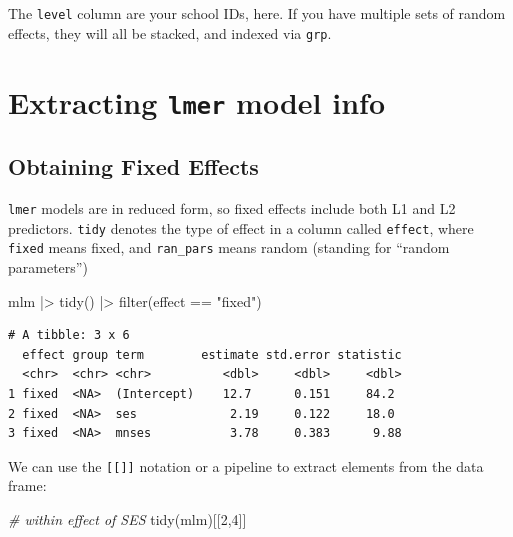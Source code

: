 \documentclass[
  letterpaper,
  DIV=11,
  numbers=noendperiod]{scrreprt}
\newenvironment{Shaded}{\begin{snugshade}}{\end{snugshade}}
\newcommand{\CommentTok}[1]{\textcolor[rgb]{0.38,0.63,0.69}{\textit{#1}}}
\newcommand{\DecValTok}[1]{\textcolor[rgb]{0.25,0.63,0.44}{#1}}
\newcommand{\FunctionTok}[1]{\textcolor[rgb]{0.02,0.16,0.49}{#1}}
\newcommand{\NormalTok}[1]{\textcolor[rgb]{0.00,0.44,0.13}{#1}}
\newcommand{\SpecialCharTok}[1]{\textcolor[rgb]{0.25,0.44,0.63}{#1}}
\newcommand{\StringTok}[1]{\textcolor[rgb]{0.25,0.44,0.63}{#1}}
\begin{document}
The \texttt{level} column are your school IDs, here. If you have
multiple sets of random effects, they will all be stacked, and indexed
via \texttt{grp}.

\hypertarget{extracting-lmer-model-info}{%
\section{\texorpdfstring{Extracting \texttt{lmer} model
info}{Extracting lmer model info}}\label{extracting-lmer-model-info}}

\hypertarget{obtaining-fixed-effects}{%
\subsection{Obtaining Fixed Effects}\label{obtaining-fixed-effects}}

\texttt{lmer} models are in reduced form, so fixed effects include both
L1 and L2 predictors. \texttt{tidy} denotes the type of effect in a
column called \texttt{effect}, where \texttt{fixed} means fixed, and
\texttt{ran\_pars} means random (standing for ``random parameters'')

\begin{Shaded}
\begin{Highlighting}[]
\NormalTok{mlm }\SpecialCharTok{|\textgreater{}} 
  \FunctionTok{tidy}\NormalTok{() }\SpecialCharTok{|\textgreater{}} 
  \FunctionTok{filter}\NormalTok{(effect }\SpecialCharTok{==} \StringTok{"fixed"}\NormalTok{)}
\end{Highlighting}
\end{Shaded}

\begin{verbatim}
# A tibble: 3 x 6
  effect group term        estimate std.error statistic
  <chr>  <chr> <chr>          <dbl>     <dbl>     <dbl>
1 fixed  <NA>  (Intercept)    12.7      0.151     84.2 
2 fixed  <NA>  ses             2.19     0.122     18.0 
3 fixed  <NA>  mnses           3.78     0.383      9.88
\end{verbatim}

We can use the \texttt{{[}{[}{]}{]}} notation or a pipeline to extract
elements from the data frame:

\begin{Shaded}
\begin{Highlighting}[]
\CommentTok{\# within effect of SES}
\FunctionTok{tidy}\NormalTok{(mlm)[[}\DecValTok{2}\NormalTok{,}\DecValTok{4}\NormalTok{]]}
\end{Highlighting}
\end{Shaded}
\end{document}
